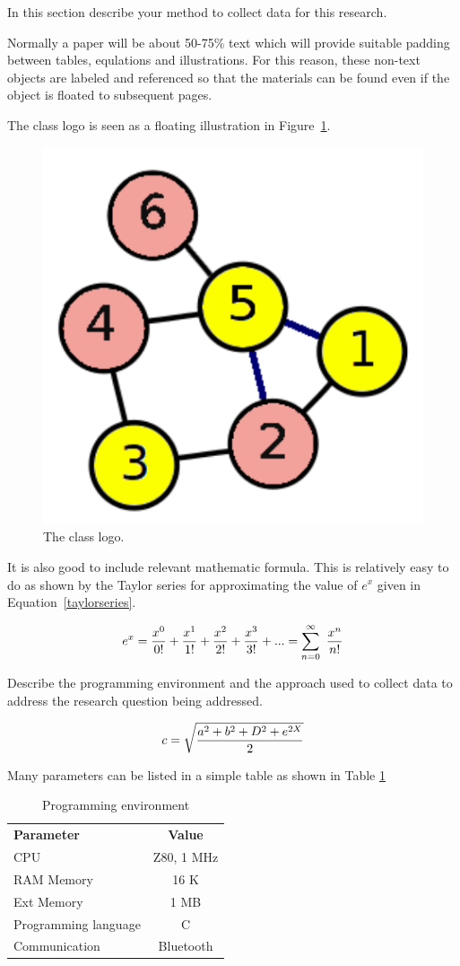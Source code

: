 \documentclass[journal,12pt]{IEEEtran}
\begin{document}
In this section describe your method to collect data for this research.

Normally a paper will be about 50-75\% text which will provide suitable padding between tables, equlations and illustrations. For this reason, these non-text objects are labeled and referenced so that the materials can be found even if the object is floated to subsequent pages.

The class logo is seen as a floating illustration in Figure~\ref{fig_classlogo}.

\begin{figure}[htb]
\centering
\includegraphics[width=0.5\columnwidth]{img/classlogo.pdf}
\caption{The class logo.}
\label{fig_classlogo}
\end{figure}

It is also good to include relevant mathematic formula. This is relatively easy to do as shown by the Taylor series for approximating the value of $e^x$ given in Equation~\ref{taylorseries}.

\begin{equation}
\label{taylorseries}
e^x = {x^0\over 0!} + {x^1\over 1!} + {x^2\over 2!} +{x^3\over 3!} + ...= \sum^\infty_{n=0}\ {x^n\over n!}
\end{equation}

Describe the programming environment and the approach used to collect data to address the research question being addressed.

\begin{equation}
\label{ts}
c=\sqrt{a^2+b^2 +D^2 + e^{2X}\over 2}
\end{equation}

Many parameters can be listed in a simple table as shown in  Table \ref{progenv}

\begin{table}[htb]
\centering
\caption{Programming environment}
\medskip
\label{progenv}
\begin{tabular}{lc}
\textbf{Parameter} & \textbf{Value}\\
CPU & Z80, 1 MHz\\
RAM Memory & 16 K\\
Ext Memory & 1 MB\\
Programming language & C \\
Communication& Bluetooth \\
\end{tabular}
\end{table}
\end{document}
